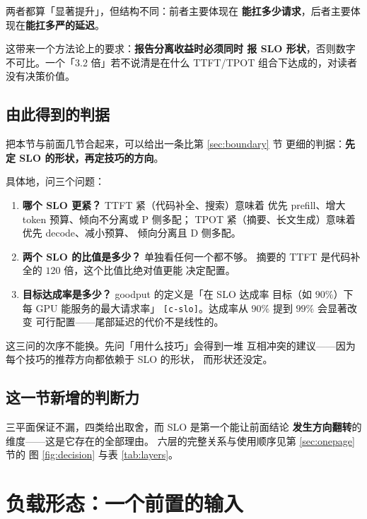 \noindent 两者都算「显著提升」，但结构不同：前者主要体现在
\textbf{能扛多少请求}，后者主要体现在\textbf{能扛多严的延迟}。

\noindent 这带来一个方法论上的要求：\textbf{报告分离收益时必须同时
报 SLO 形状}，否则数字不可比。一个「3.2 倍」若不说清是在什么
TTFT/TPOT 组合下达成的，对读者没有决策价值。

\subsection{由此得到的判据}

把本节与前面几节合起来，可以给出一条比第 \ref{sec:boundary} 节
更细的判据：\textbf{先定 SLO 的形状，再定技巧的方向}。

\noindent 具体地，问三个问题：

\begin{enumerate}[leftmargin=1.4em,itemsep=2pt,topsep=3pt]
  \item \textbf{哪个 SLO 更紧？} TTFT 紧（代码补全、搜索）意味着
        优先 prefill、增大 token 预算、倾向不分离或 P 侧多配；
        TPOT 紧（摘要、长文生成）意味着优先 decode、减小预算、
        倾向分离且 D 侧多配。
  \item \textbf{两个 SLO 的比值是多少？} 单独看任何一个都不够。
        摘要的 TTFT 是代码补全的 $120$ 倍，这个比值比绝对值更能
        决定配置。
  \item \textbf{目标达成率是多少？} goodput 的定义是「在 SLO 达成率
        目标（如 $90\%$）下每 GPU 能服务的最大请求率」
        \texttt{[c-slo]}。达成率从 $90\%$ 提到 $99\%$ 会显著改变
        可行配置——尾部延迟的代价不是线性的。
\end{enumerate}

\noindent 这三问的次序不能换。先问「用什么技巧」会得到一堆
互相冲突的建议——因为每个技巧的推荐方向都依赖于 SLO 的形状，
而形状还没定。

\subsection{这一节新增的判断力}

三平面保证不漏，四类给出取舍，而 SLO 是第一个能让前面结论
\textbf{发生方向翻转}的维度——这是它存在的全部理由。
六层的完整关系与使用顺序见第 \ref{sec:onepage} 节的
图 \ref{fig:decision} 与表 \ref{tab:layers}。

\section{负载形态：一个前置的输入}
\label{sec:load}

